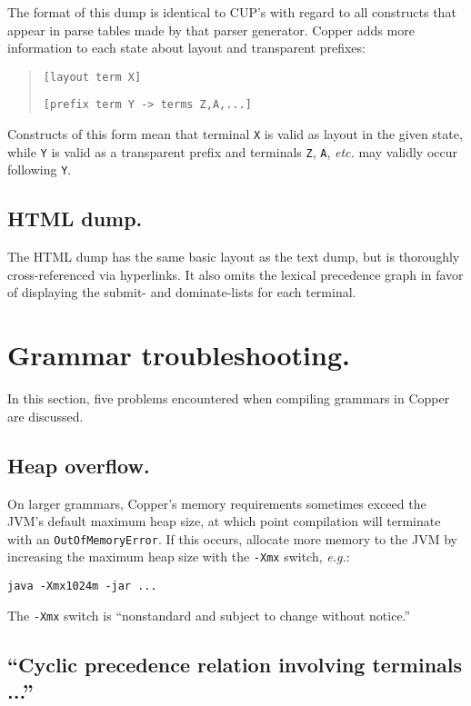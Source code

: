 \documentclass[12pt,english,twoside]{report}
\begin{document}
The format of this dump is identical to CUP's with regard to all constructs
that appear in parse tables made by that parser generator. Copper
adds more information to each state about layout and transparent prefixes:

\begin{quotation}
\texttt{{[}layout term X]}

\texttt{{[}prefix term Y -> terms Z,A,...]}
\end{quotation}
Constructs of this form mean that terminal \texttt{X} is valid as
layout in the given state, while \texttt{Y} is valid as a transparent
prefix and terminals \texttt{Z}, \texttt{A}, \emph{etc.} may validly
occur following \texttt{Y}.

\subsection{HTML dump.}

The HTML dump has the same basic layout as the text dump, but is
thoroughly cross-referenced via hyperlinks. It also omits the lexical
precedence graph in favor of displaying the submit- and dominate-lists
for each terminal.

\section{Grammar troubleshooting.}

In this section, five problems encountered when compiling grammars
in Copper are discussed.

\subsection{Heap overflow.}

On larger grammars, Copper's memory requirements sometimes exceed the
JVM's default maximum heap size, at which point compilation will terminate with an \texttt{OutOfMemoryError}. If this occurs, allocate more memory to the JVM by increasing the maximum heap size with the \texttt{-Xmx} switch, \emph{e.g.}:

\begin{verbatim}
java -Xmx1024m -jar ...
\end{verbatim}
The \texttt{-Xmx} switch is {}``nonstandard and subject to change
without notice.''


\subsection{\label{sub:Contradiction-involving-terminals}{}``Cyclic precedence relation involving terminals ...''}
\end{document}
